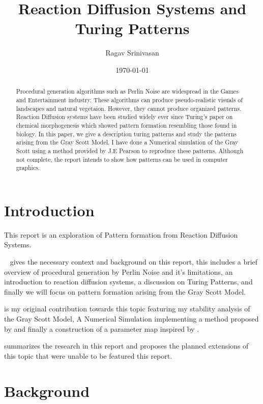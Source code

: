 \documentclass[a4paper, 11pt]{article}
\title{Reaction Diffusion Systems and Turing Patterns}
\author{Ragav Srinivasan}
\date{\today}
\begin{document}
\maketitle

\begin{abstract}
	Procedural generation algorithms such as Perlin Noise are widespread in the Games and Entertainment industry. These algorithms can produce pseudo-realistic visuals of landscapes and natural vegetaion. However, they cannot produce organized patterns. Reaction Diffusion systems have been studied widely ever since Turing's paper on chemical morphogenesis which showed pattern formation resembling those found in biology. In this paper, we give a description turing patterns and study the patterns arising from the Gray Scott Model. I have done a Numerical simulation of the Gray Scott using a method provided by J.E Pearson to reproduce these patterns. Although not complete, the report intends to show how patterns can be used in computer graphics. 
\end{abstract}

\section{Introduction}
\label{sec:introduction}

This report is an exploration of Pattern formation from Reaction Diffusion Systems. 

\
 gives the necessary context and background on this report, this includes a brief overview of procedural generation by Perlin Noise and it's limitations, an introduction to reaction diffusion systems, a discussion on Turing Patterns, and finally we will focus on pattern formation arising from the Gray Scott Model.   

 is my original contribution towards this topic featuring my stability analysis of the Gray Scott Model, A Numerical Simulation implementing a method proposed by \parencite{pearson1993} and finally a construction of a parameter map inspired by \parencite{munafo2022pearson}.   

 summarizes the research in this report and proposes the planned extensions of this topic that were unable to be featured this report. 


\section{Background}
\label{sec:background}
\end{document}
